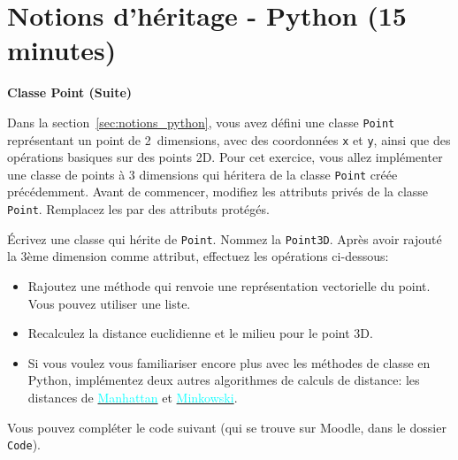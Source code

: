 \section{Notions d'héritage - Python (15 minutes)}
\begin{Exercice}[15 minutes]\textbf{Classe Point (Suite)}

    Dans la section~\ref{sec:notions_python}, vous avez défini une classe \lstinline{Point} représentant un point de 2~dimensions, avec des coordonnées \lstinline{x} et \lstinline{y}, ainsi que des opérations basiques sur des points 2D. Pour cet exercice, vous allez implémenter une classe de points à 3 dimensions qui héritera de la classe \lstinline{Point} créée précédemment.
    Avant de commencer, modifiez les attributs privés de la classe \lstinline{Point}. Remplacez les par des attributs protégés.
    

    
    Écrivez une classe qui hérite de \lstinline{Point}. Nommez la \lstinline{Point3D}. Après avoir rajouté la 3ème dimension comme attribut, effectuez les opérations ci-dessous:
    
    \begin{itemize}
        \item Rajoutez une méthode qui renvoie une représentation vectorielle du point. Vous pouvez utiliser une liste.
        \item Recalculez la distance euclidienne et le milieu pour le point 3D.
        \item \advanced Si vous voulez vous familiariser encore plus avec les méthodes de classe en Python, implémentez deux autres algorithmes de calculs de distance: les distances de \href{https://fr.wikipedia.org/wiki/Distance_de_Manhattan}{\textcolor{cyan}{Manhattan}} et \href{https://en.wikipedia.org/wiki/Minkowski_distance}{\textcolor{cyan}{Minkowski}}.
    \end{itemize}

    Vous pouvez compléter le code suivant (qui se trouve sur Moodle, dans le dossier \lstinline{Code}).
     
    

\end{Exercice}
